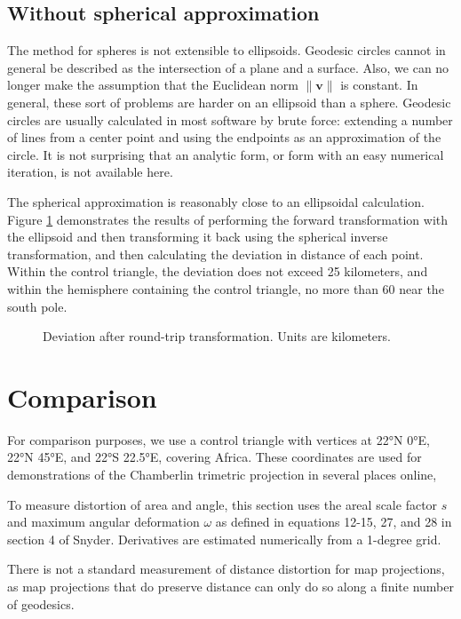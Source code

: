 \documentclass{amsart}[12pt]
\begin{document}
\subsection{Without spherical approximation}
The method for spheres is not extensible to ellipsoids. Geodesic
circles cannot in general be described as the intersection of a plane and a
surface. Also, we can no longer make the assumption that the Euclidean norm
$\|\mathbf v\|$ is constant. In general, these sort of problems are harder on
an ellipsoid than a sphere. Geodesic circles are usually calculated in most
software by brute force: extending a number of lines from a center point and
using the endpoints as an approximation of the circle.\cite{idfk}
It is not surprising that an analytic form,
or form with an easy numerical iteration, is not available here.

The spherical approximation is reasonably close to an ellipsoidal
calculation. Figure \ref{fig:roundtrip} demonstrates the results of performing
the forward transformation with the ellipsoid and then transforming it back
using the spherical inverse transformation, and then calculating the deviation
in distance of each point. Within the control triangle, the
deviation does not exceed 25 kilometers, and within the hemisphere containing the
control triangle, no more than 60 near the south pole.

\begin{figure}%

\caption{Deviation after round-trip transformation. Units are kilometers.}
\label{fig:roundtrip}
\end{figure}

\section{Comparison}
For comparison purposes, we use a control triangle with vertices at 22°N 0°E,
22°N 45°E, and 22°S 22.5°E, covering Africa. These coordinates are used for
demonstrations of the Chamberlin trimetric projection in several places online,

To measure distortion of area and angle, this section uses the areal scale
factor $s$ and maximum angular deformation $\omega$ as defined in equations
12-15, 27, and 28 in section 4 of Snyder.\cite{snyder87} Derivatives are
estimated numerically from a 1-degree grid.

There is not a standard
measurement of distance distortion for map projections, as map projections that
do preserve distance can only do so along a finite number of geodesics.
\end{document}
